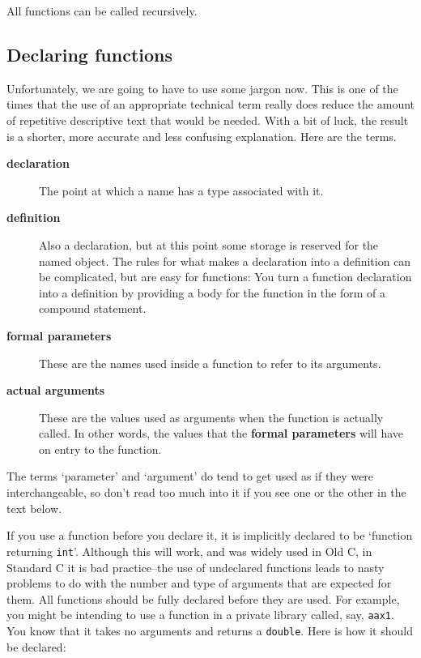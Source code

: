  All functions can be called recursively.


  \subsection{Declaring functions}
   

   Unfortunately, we are going to have to use some jargon now. This is
    one of the times that the use of an appropriate technical term really
    does reduce the amount of repetitive descriptive text that would be
    needed. With a bit of luck, the result is a shorter, more accurate and
    less confusing explanation. Here are the terms.

   \begin{description}
    \item[\textbf{declaration}] The point at which a name has a type associated with it.

    \item[\textbf{definition}] Also a declaration, but at this point some storage is reserved for
     the named object. The rules for what makes a declaration into a
     definition can be complicated, but are easy for functions: You turn a
     function declaration into a definition by providing a body for the
     function in the form of a compound statement.

    \item[\textbf{formal parameters}] These are the names used inside a function to refer to its
     arguments.

    \item[\textbf{actual arguments}] These are the values used as arguments when the function is actually
     called. In other words, the values that the \textbf{formal parameters}
     will have on entry to the function.
   \end{description}
   The terms `parameter' and `argument' do tend to get used
    as if they were interchangeable, so don't read too much into it if you
    see one or the other in the text below.


   If you use a function before you declare it, it is implicitly declared
    to be `function returning \texttt{int}'. Although this will
    work, and was widely used in Old C, in Standard C it is bad
    practice--the use of undeclared functions leads to nasty problems to
    do with the number and type of arguments that are expected for them. All
    functions should be fully declared before they are used. For example,
    you might be intending to use a function in a private library called,
    say, \texttt{aax1}. You know that it takes no arguments and returns
    a \texttt{double}. Here is how it should be declared:

